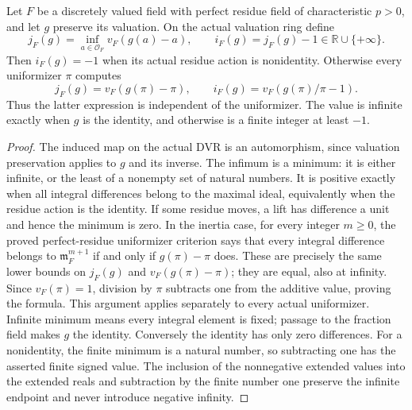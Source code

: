 \begin{lemma}
\label{fw:valued-automorphism-ramification-number}
\leanok
Let $F$ be a discretely valued field with perfect residue field of
characteristic $p>0$, and let $g$ preserve its valuation. On the actual
valuation ring define
\[
 j_F(g)=\inf_{a\in\mathcal O_F}v_F(g(a)-a),\qquad
 i_F(g)=j_F(g)-1\in\mathbb R\cup\{+\infty\}.
\]
Then $i_F(g)=-1$ when its actual residue action is nonidentity.
Otherwise every uniformizer $\pi$ computes
\[
 j_F(g)=v_F(g(\pi)-\pi),\qquad
 i_F(g)=v_F(g(\pi)/\pi-1).
\]
Thus the latter expression is independent of the uniformizer.
The value is infinite exactly when $g$ is the identity, and otherwise
is a finite integer at least $-1$.
\end{lemma}
\begin{proof}
The induced map on the actual DVR is an automorphism, since valuation
preservation applies to $g$ and its inverse. The infimum is a minimum:
it is either infinite, or the least of a nonempty set of natural
numbers. It is positive exactly when all integral differences belong
to the maximal ideal, equivalently when the residue action is the
identity. If some residue moves, a lift has difference a unit and
hence the minimum is zero.
In the inertia case, for every integer $m\geq0$, the proved
perfect-residue uniformizer criterion says that every integral
difference belongs to $\mathfrak m_F^{m+1}$ if and only if
$g(\pi)-\pi$ does. These are precisely the same lower bounds on
$j_F(g)$ and $v_F(g(\pi)-\pi)$; they are equal, also at infinity.
Since $v_F(\pi)=1$, division by $\pi$ subtracts one from the
additive value, proving the formula. This argument applies separately
to every actual uniformizer. Infinite minimum means every integral
element is fixed; passage to the fraction field makes $g$ the identity.
Conversely the identity has only zero differences. For a nonidentity,
the finite minimum is a natural number, so subtracting one has the
asserted finite signed value. The inclusion of the nonnegative
extended values into the extended reals and subtraction by the finite
number one preserve the infinite endpoint and never introduce
negative infinity.
\end{proof}

